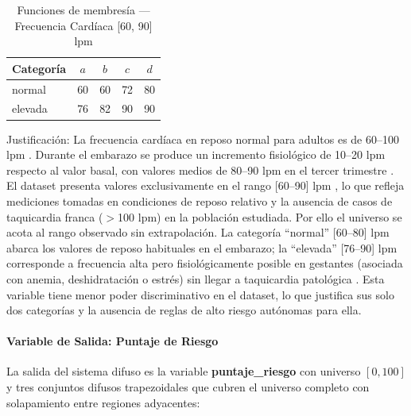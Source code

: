 \documentclass[11pt]{article}
\begin{document}
\begin{table}[H]
    \centering
    \caption{Funciones de membres\'ia --- Frecuencia Card\'iaca [60, 90] lpm}
    \begin{tabular}{lcccc}
        \toprule
        \textbf{Categoría} & $a$ & $b$ & $c$ & $d$ \\
        \midrule
        normal             & 60  & 60  & 72  & 80  \\
        elevada            & 76  & 82  & 90  & 90  \\
        \bottomrule
    \end{tabular}
    \par{}
\end{table}

Justificaci\'on: La frecuencia card\'iaca en reposo normal para adultos es de 60--100 lpm \cite{monga1995}. Durante el embarazo se produce un incremento fisiol\'ogico de 10--20 lpm respecto al valor basal, con valores medios de 80--90 lpm en el tercer trimestre \cite{monga1995,sanghavi2014}. El dataset presenta valores exclusivamente en el rango [60--90] lpm \cite{ahmed2020}, lo que refleja mediciones tomadas en condiciones de reposo relativo y la ausencia de casos de taquicardia franca ($>$100 lpm) en la poblaci\'on estudiada. Por ello el universo se acota al rango observado sin extrapolaci\'on. La categor\'ia ``normal'' [60--80] lpm abarca los valores de reposo habituales en el embarazo; la ``elevada'' [76--90] lpm corresponde a frecuencia alta pero fisiol\'ogicamente posible en gestantes (asociada con anemia, deshidrataci\'on o estr\'es) sin llegar a taquicardia patol\'ogica \cite{sanghavi2014}. Esta variable tiene menor poder discriminativo en el dataset, lo que justifica sus solo dos categor\'ias y la ausencia de reglas de alto riesgo aut\'onomas para ella.

\paragraph{Variable de Salida: Puntaje de Riesgo}

La salida del sistema difuso es la variable \textbf{puntaje\_riesgo} con universo $[0, 100]$ y tres conjuntos difusos trapezoidales que cubren el universo completo con solapamiento entre regiones adyacentes:
\end{document}
